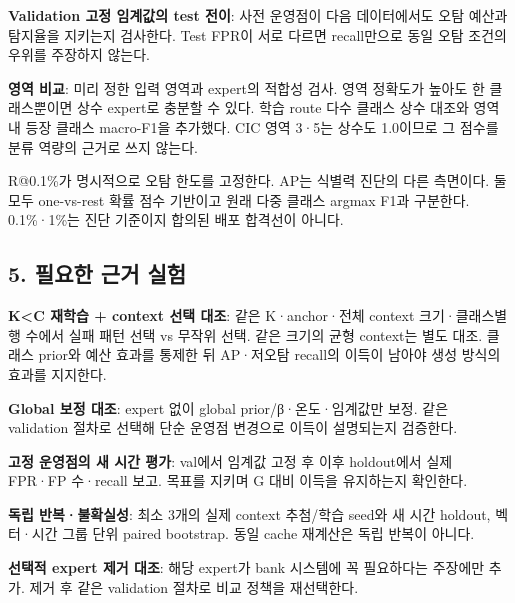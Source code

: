 \par\noindent \textbullet\enspace \textbf{Validation 고정 임계값의 test 전이}: 사전 운영점이 다음 데이터에서도 오탐 예산과 탐지율을 지키는지 검사한다. Test FPR이 서로 다르면 recall만으로 동일 오탐 조건의 우위를 주장하지 않는다.


\par\noindent \textbullet\enspace \textbf{영역 비교}: 미리 정한 입력 영역과 expert의 적합성 검사. 영역 정확도가 높아도 한 클래스뿐이면 상수 expert로 충분할 수 있다. 학습 route 다수 클래스 상수 대조와 영역 내 등장 클래스 macro-F1을 추가했다. CIC 영역 3·5는 상수도 1.0이므로 그 점수를 분류 역량의 근거로 쓰지 않는다.


R@0.1\%가 명시적으로 오탐 한도를 고정한다. AP는 식별력 진단의 다른 측면이다. 둘 모두 one-vs-rest 확률 점수 기반이고 원래 다중 클래스 argmax F1과 구분한다. 0.1\%·1\%는 진단 기준이지 합의된 배포 합격선이 아니다.

\subsection{5. 필요한 근거 실험}
\par\noindent \textbullet\enspace \textbf{K<C 재학습 +\allowbreak{} context 선택 대조}: 같은 K·anchor·전체 context 크기·클래스별 행 수에서 실패 패턴 선택 vs 무작위 선택. 같은 크기의 균형 context는 별도 대조. 클래스 prior와 예산 효과를 통제한 뒤 AP·저오탐 recall의 이득이 남아야 생성 방식의 효과를 지지한다.


\par\noindent \textbullet\enspace \textbf{Global 보정 대조}: expert 없이 global prior/\allowbreak{}β·온도·임계값만 보정. 같은 validation 절차로 선택해 단순 운영점 변경으로 이득이 설명되는지 검증한다.


\par\noindent \textbullet\enspace \textbf{고정 운영점의 새 시간 평가}: val에서 임계값 고정 후 이후 holdout에서 실제 FPR·FP 수·recall 보고. 목표를 지키며 G 대비 이득을 유지하는지 확인한다.


\par\noindent \textbullet\enspace \textbf{독립 반복·불확실성}: 최소 3개의 실제 context 추첨/\allowbreak{}학습 seed와 새 시간 holdout, 벡터·시간 그룹 단위 paired bootstrap. 동일 cache 재계산은 독립 반복이 아니다.


\par\noindent \textbullet\enspace \textbf{선택적 expert 제거 대조}: 해당 expert가 bank 시스템에 꼭 필요하다는 주장에만 추가. 제거 후 같은 validation 절차로 비교 정책을 재선택한다.


